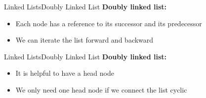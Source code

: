 
\begin{frame}{Linked Lists}{Doubly Linked List}
  \textbf{Doubly linked list:}
  \begin{itemize}
    \item<2->
      Each node has a reference to its successor and its
      {\color{Mittel-Blau}predecessor}
    \item<3->
      We can iterate the list forward and backward
  \end{itemize}
  \begin{flushleft}
    
  \end{flushleft}
\end{frame}


\begin{frame}{Linked Lists}{Doubly Linked List}
  \textbf{Doubly linked list:}
  \begin{itemize}
    \item<2->
      It is helpful to have a {\color{Mittel-Blau}head} node
    \item<3->
      We only need {\color{Mittel-Blau}one head} node if we connect the list
      cyclic
  \end{itemize}
  \begin{flushleft}
    
  \end{flushleft}
\end{frame}


